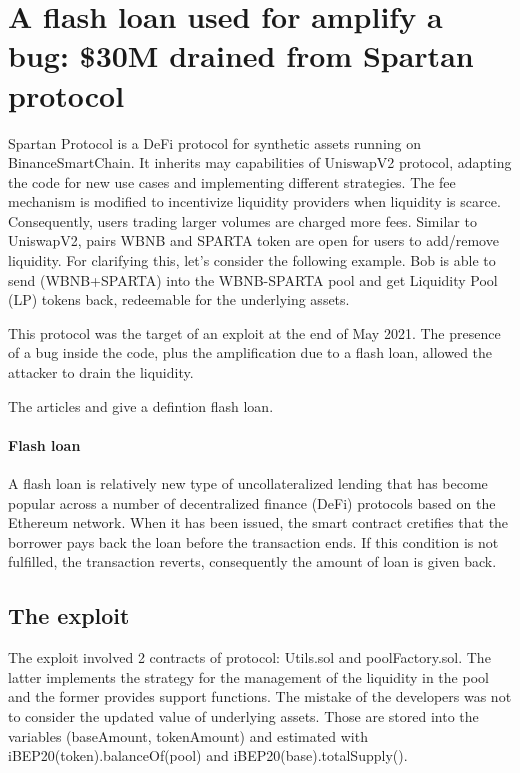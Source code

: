 \section{A flash loan used for amplify a bug: \$30M  drained from Spartan protocol}   
\label{sec:Exploits:Spartan}
Spartan Protocol is a DeFi protocol for synthetic assets running on BinanceSmartChain. 
It inherits may capabilities of UniswapV2 protocol, adapting the code for new use cases and implementing different strategies. 
The fee mechanism is modified to incentivize liquidity providers when liquidity is scarce. Consequently, users trading larger 
volumes are charged more fees. Similar to UniswapV2, pairs WBNB and SPARTA token are open for users to add/remove liquidity. 
For clarifying this, let's consider the following example. Bob is able to send (WBNB+SPARTA) into the WBNB-SPARTA pool and get Liquidity Pool (LP) tokens back, 
redeemable for the underlying assets.

This protocol was the target of an exploit at the end of May 2021.
The presence of a bug inside the code, plus the amplification due to a flash loan, allowed the attacker to drain the liquidity.

The articles  and  give a defintion flash loan.

\paragraph{Flash loan} A flash loan is relatively new type of uncollateralized lending that has become popular across a 
number of decentralized finance (DeFi) protocols based on the Ethereum network. 
When it has been issued, the smart contract cretifies that the borrower pays back the loan before the transaction ends. 
If this condition is not fulfilled, the transaction reverts, consequently the amount of loan is given back. 


\subsection{The exploit}
\label{sec:Spartan:Exploit}
The exploit involved 2 contracts of protocol: Utils.sol and poolFactory.sol.
The latter implements the strategy for the management of the liquidity in the pool and the former provides support functions. 
The mistake of the developers was not to consider the updated value of underlying assets. 
Those are stored into the variables (baseAmount, tokenAmount) and estimated with iBEP20(token).balanceOf(pool) and iBEP20(base).totalSupply().

